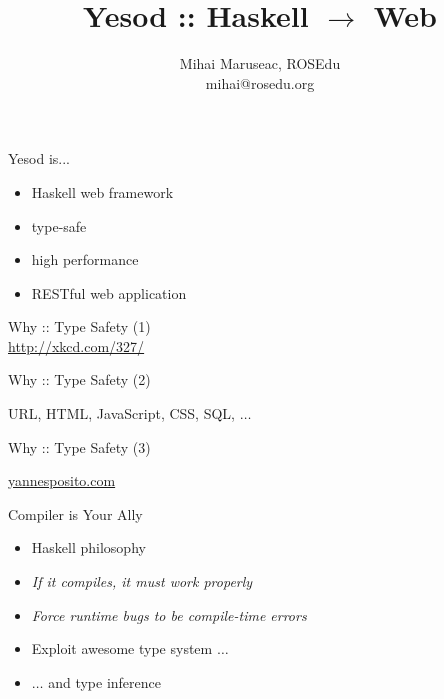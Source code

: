 \documentclass{beamer}
\title{Yesod :: Haskell $\rightarrow$ Web}
\author{Mihai Maruseac, ROSEdu\\mihai@rosedu.org}
\begin{document}
\maketitle

\begin{frame}{Yesod is...}
  \begin{itemize}[<+->]
    \item Haskell web framework
    \item type-safe
    \item high performance
    \item RESTful web application
  \end{itemize}
  \vspace{-3cm}
  \hspace{6cm}
\end{frame}

\begin{frame}{Why :: Type Safety (1)}
  \\
  \url{http://xkcd.com/327/}
\end{frame}

\begin{frame}{Why :: Type Safety (2)}
  \begin{center}
  \end{center}
    URL, HTML, JavaScript, CSS, SQL, $\ldots$
\end{frame}

\begin{frame}{Why :: Type Safety (3)}
  \begin{center}
  \end{center}
  \href{http://yannesposito.com/Scratch/en/blog/Yesod-tutorial-for-newbies/}{yannesposito.com}
\end{frame}

\begin{frame}{Compiler is Your Ally}
  \begin{itemize}[<+->]
    \item Haskell philosophy
    \item \textit{If it compiles, it must work properly}
    \item \textit{Force runtime bugs to be compile-time errors}
    \item Exploit awesome type system $\ldots$
    \item $\ldots$ and type inference
  \end{itemize}
\end{frame}
\end{document}
